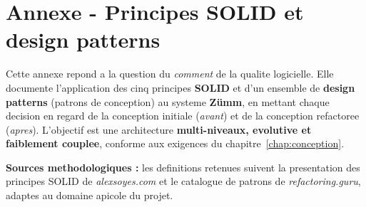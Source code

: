 
\chapter{Annexe - Principes SOLID et design patterns}
\label{chap:solid}
Cette annexe repond a la question du \emph{comment} de la qualite logicielle.
Elle documente l'application des cinq principes \textbf{SOLID} et d'un ensemble
de \textbf{design patterns} (patrons de conception) au systeme \textbf{Z\"umm},
en mettant chaque decision en regard de la conception initiale (\emph{avant})
et de la conception refactoree (\emph{apres}). L'objectif est une architecture
\textbf{multi-niveaux, evolutive et faiblement couplee}, conforme aux exigences
du chapitre~\ref{chap:conception}.

\begin{encadre}
\textbf{Sources methodologiques :} les definitions retenues suivent la
presentation des principes SOLID de \emph{alexsoyes.com} et le catalogue de
patrons de \emph{refactoring.guru}, adaptes au domaine apicole du projet.
\end{encadre}

